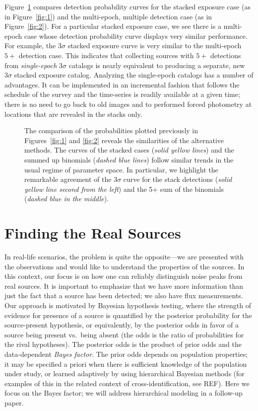 \documentclass[twocolumn]{emulateapj}
\begin{document}
Figure~\ref{fig:3} compares detection probability curves for the stacked exposure case (as in Figure~\ref{fig:1}) and the multi-epoch, multiple detection case (as in Figure~\ref{fig:2}).
For a particular stacked exposure case, we see there is a multi-epoch case whose detection probability curve displays very similar performance.
For example, the $3\sigma$ stacked exposure curve is very similar to the multi-epoch $5+$ detection case.
This indicates that collecting sources with $5+$ detections from \emph{single-epoch} $3\sigma$ catalogs is nearly equivalent to producing a separate, new $3\sigma$ stacked exposure catalog.
%
Analyzing the single-epoch catalogs has a number of advantages.
It can be implemented in an incremental fashion that follows the schedule of the survey and the time-series is readily available at a given time; there is no need to go back to old images and to performed forced photometry at locations that are revealed in the stacks only.

\begin{figure}[t]
\caption{The comparison of the probabilities plotted previously in Figures~\ref{fig:1} and \ref{fig:2} reveals the similarities of the alternative methods. The curves of the stacked cases ({\it{}solid yellow lines}) and the summed up binomials ({\it{}dashed blue lines}) follow similar trends in the usual regime of parameter space. In particular, we highlight the remarkable agreement of the 3$\sigma$ curve for the stack detections ({\it{}solid yellow line second from the left}) and the 5+ sum of the binomials ({\it{}dashed blue in the middle}).}
\label{fig:3}
\end{figure}


\section{Finding the Real Sources}
\noindent
%
In real-life scenarios, the problem is quite the opposite---we are presented with the observations and would like to understand the properties of the sources. 
In this context, our focus is on how one can reliably distinguish noise peaks from real sources. 
It is important to emphasize that we have more information than just the fact that a source has been detected; we also have flux measurements. 
Our approach is motivated by Bayesian hypothesis testing, where the strength of evidence for presence of a source is quantified by the posterior probability for the source-present hypothesis, or equivalently, by the posterior odds in favor of a source being present vs.\ being absent (the odds is the ratio of probabilities for the rival hypotheses).
The posterior odds is the product of prior odds and the data-dependent \emph{Bayes factor}.
The prior odds depends on population properties; it may be specified a priori when there is sufficient knowledge of the population under study, or learned adaptively by using hierarchical Bayesian methods (for examples of this in the related context of cross-identification, see REF).
Here we focus on the Bayes factor; we will address hierarchical modeling in a follow-up paper.
\end{document}
